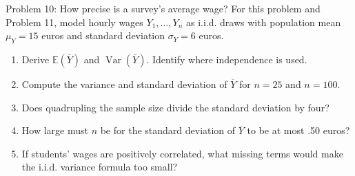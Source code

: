 \documentclass[notes,10pt, aspectratio=169]{beamer}
\newcommand{\E}{\mathbb{E}}
\newcommand{\Var}{\operatorname{Var}}
\begin{document}
\begin{frame}{Problem 10: How precise is a survey's average wage?}
For this problem and Problem 11, model hourly wages $Y_1,\ldots,Y_n$ as i.i.d. draws with population mean $\mu_Y=15$ euros and standard deviation $\sigma_Y=6$ euros.
\begin{enumerate}
\setlength{\itemsep}{8pt}
\item Derive $\E(\overline Y)$ and $\Var(\overline Y)$. Identify where independence is used.
\item Compute the variance and standard deviation of $\overline Y$ for $n=25$ and $n=100$.
\item Does quadrupling the sample size divide the standard deviation by four?
\item How large must $n$ be for the standard deviation of $\overline Y$ to be at most .50 euros?
\item If students' wages are positively correlated, what missing terms would make the i.i.d. variance formula too small?
\end{enumerate}
\end{frame}
\end{document}
